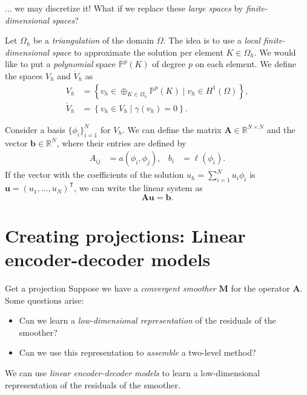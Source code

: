 \documentclass{beamer}
\newcommand{\A}{\mathbf{A}}
\newcommand{\M}{\mathbf{M}}
\newcommand{\uu}{\mathbf{u}}
\newcommand{\bb}{\mathbf{b}}
\begin{document}
\begin{frame}{... we may discretize it!}
    What if we replace these \emph{large spaces} by \emph{finite-dimensional spaces}?

    \pause

    Let \(\Omega_h\) be a \emph{triangulation} of the domain \(\Omega\).
    The idea is to use a \emph{local finite-dimensional space} to approximate the solution per element \(K \in \Omega_h\).
    We would like to put a \emph{polynomial} space \(\mathbb{P}^p(K)\) of degree \(p\) on each element.
    We define the spaces \(V_h\) and \(\mathring{V}_h\) as
    \begin{subequations}
        \begin{align}
            V_h &= \left\{ v_h \in \displaystyle\oplus_{K \in \Omega_h} \mathbb{P}^p(K) \mid v_h \in H^1(\Omega) \right\}, \\
            \mathring{V}_h &= \left\{ v_h \in V_h \mid \gamma(v_h) = 0 \right\}.
        \end{align}
    \end{subequations}

    \pause

    Consider a basis \(\{ \phi_i \}_{i=1}^{N}\) for \(V_h\).
    We can define the matrix \(\A \in \mathbb{R}^{N \times N}\) and the vector \(\bb \in \mathbb{R}^{N}\), where their entries are defined by
    \begin{align*}
        A_{ij} &= a(\phi_i, \phi_j), &
        b_i &= \ell(\phi_i).
    \end{align*}
    If the vector with the coefficients of the solution \(u_h = \sum_{i=1}^{N} u_i \phi_i\) is \(\uu = (u_1, \ldots, u_N)^\mathsf{T}\), we can write the linear system as
    \begin{equation*}
        \A \uu = \bb.
    \end{equation*}
\end{frame}

\section{Creating projections: Linear encoder-decoder models}

\begin{frame}{Get a projection}
    Suppose we have a \emph{convergent smoother} \(\M\) for the operator \(\A\).
    Some questions arise:
    \begin{itemize}
        \item Can we learn a \emph{low-dimensional representation} of the residuals of the smoother?
        \item Can we use this representation to \emph{assemble} a two-level method?
    \end{itemize}

    \pause

    We can use \emph{linear encoder-decoder models} to learn a low-dimensional representation of the residuals of the smoother.
\end{frame}
\end{document}
